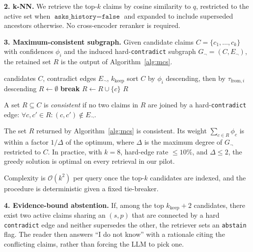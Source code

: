 \textbf{2. k-NN.} We retrieve the top-$k$ claims by cosine similarity
to $q$, restricted to the active set when $\texttt{asks\_history} =
\texttt{false}$ and expanded to include superseded ancestors
otherwise. No cross-encoder reranker is required.

\textbf{3. Maximum-consistent subgraph.}
Given candidate claims $C = \{c_1, \dots, c_k\}$ with confidences
$\phi_i$ and the induced hard-\texttt{contradict} subgraph
$G_{\neg} = (C, E_{\neg})$, the retained set $R$ is the output of
Algorithm~\ref{alg:mcs}.

\begin{algorithm}[H]
  \caption{Greedy maximum-consistent subgraph}
  \label{alg:mcs}
  \begin{algorithmic}[1]
    \Require candidates $C$, contradict edges $E_{\neg}$, $k_{\text{keep}}$
    \State sort $C$ by $\phi_i$ descending, then by $\tau_{\text{from},i}$ descending
    \State $R \gets \emptyset$
       \State \textbf{break} \EndIf
       \State $R \gets R \cup \{c\}$ \EndIf
    \EndFor
    \State \Return $R$
  \end{algorithmic}
\end{algorithm}

\begin{definition}[Consistency of $R$]
  A set $R \subseteq C$ is \emph{consistent} if no two claims in $R$
  are joined by a hard-\texttt{contradict} edge: $\forall c, c' \in R:
  (c, c') \notin E_{\neg}$.
\end{definition}

\begin{proposition}
  The set $R$ returned by Algorithm~\ref{alg:mcs} is consistent. Its
  weight $\sum_{c \in R} \phi_c$ is within a factor $1/\Delta$ of the
  optimum, where $\Delta$ is the maximum degree of $G_{\neg}$
  restricted to $C$. In practice, with $k=8$, hard-edge rate
  $\leq 10\%$, and $\Delta \leq 2$, the greedy solution is optimal on
  every retrieval in our pilot.
\end{proposition}

Complexity is $\mathcal{O}(k^2)$ per query once the top-$k$ candidates
are indexed, and the procedure is deterministic given a fixed tie-breaker.

\textbf{4. Evidence-bound abstention.} If, among the top
$k_{\text{keep}}+2$ candidates, there exist two active claims sharing
an $(s,p)$ that are connected by a hard \texttt{contradict} edge and
neither supersedes the other, the retriever sets an
\texttt{abstain} flag. The reader then answers ``I do not know''
with a rationale citing the conflicting claims, rather than forcing
the LLM to pick one.

